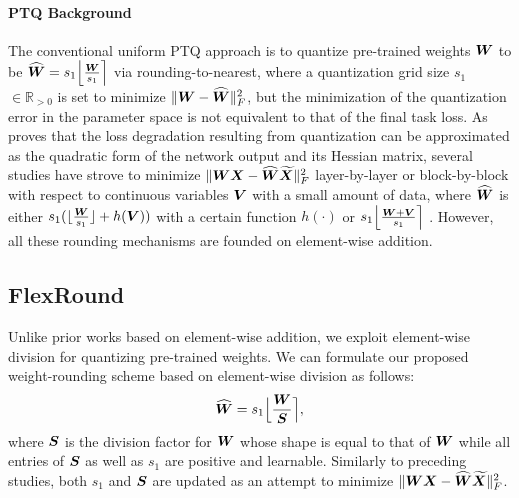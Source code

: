 \documentclass{article}
\theoremstyle{plain}
\theoremstyle{definition}
\theoremstyle{remark}
\begin{document}
\paragraph{PTQ Background} The conventional uniform PTQ approach is to quantize pre-trained weights ${\bm{W}}$ to be $\widehat{{\bm{W}}} = s_1 \Big\lfloor {{\bm{W}}\over s_1} \Big\rceil$ via rounding-to-nearest, where a quantization grid size $s_1$ $\in \mathbb{R}_{> 0}$ is set to minimize $\|{\bm{W}} - \widehat{{\bm{W}}}\|^2_F$, but the minimization of the quantization error in the parameter space is not equivalent to that of the final task loss. As \citet{li2021brecq} proves that the loss degradation resulting from quantization can be approximated as the quadratic form of the network output and its Hessian matrix, several studies have strove to minimize $\|{\bm{W}}{\bm{X}} - \widehat{{\bm{W}}}\widetilde{{\bm{X}}}\|^2_F$ layer-by-layer or block-by-block with respect to continuous variables ${\bm{V}}$ with a small amount of data, where $\widehat{{\bm{W}}}$ is either $s_1 (\lfloor {{\bm{W}}\over s_1} \rfloor + h({\bm{V}}))$ with a certain function $h(\cdot)$ \citep{nagel2020adaround} or $s_1 \Big\lfloor {{\bm{W}}+ {\bm{V}}\over s_1} \Big\rceil$ \citep{hubara2021adaquant}. However, all these rounding mechanisms are founded on element-wise addition. %



\subsection{FlexRound}\label{subsec:FlexRound}




Unlike prior works based on element-wise addition, we exploit element-wise division for quantizing pre-trained weights. We can formulate our proposed weight-rounding scheme based on element-wise division as follows:
\begin{align}
    \widehat{{\bm{W}}} = s_1 \Big\lfloor {{\bm{W}}\over {\bm{S}}} \Big\rceil, \label{eq:flexround}
\end{align}
where ${\bm{S}}$ is the division factor for ${\bm{W}}$ whose shape is equal to that of ${\bm{W}}$ while all entries of ${\bm{S}}$ as well as $s_1$ are positive and learnable. Similarly to preceding studies, both $s_1$ and ${\bm{S}}$ are updated as an attempt to minimize $\|{\bm{W}}{\bm{X}} - \widehat{{\bm{W}}}\widetilde{{\bm{X}}}\|^2_F$.
\end{document}

